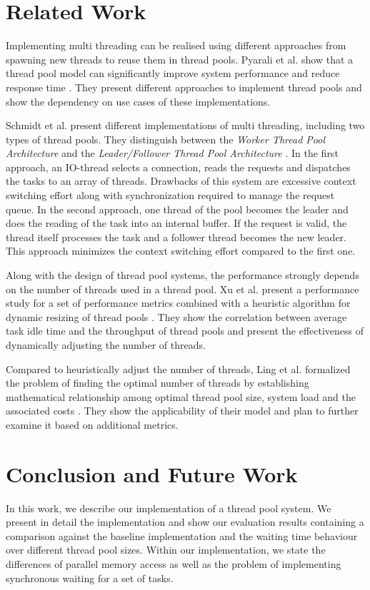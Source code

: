 \documentclass[conference]{IEEEtran}
\begin{document}
\section{Related Work}\label{sec:related}
Implementing multi threading can be realised using different approaches from spawning new threads to reuse them in thread pools. Pyarali et al. show that a thread pool model can significantly improve system performance and reduce response time \cite{pyarali2001evaluating}. They present different approaches to implement thread pools and show the dependency on use cases of these implementations.

Schmidt et al. present different implementations of multi threading, including two types of thread pools. They distinguish between the \emph{Worker Thread Pool Architecture} and the \emph{Leader/Follower Thread Pool Architecture} \cite{schmidt1998evaluating}. In the first approach, an IO-thread selects a connection, reads the requests and dispatches the tasks to an array of threads. Drawbacks of this system are excessive context switching effort along with synchronization required to manage the request queue. In the second approach, one thread of the pool becomes the leader and does the reading of the task into an internal buffer. If the request is valid, the thread itself processes the task and a follower thread becomes the new leader. This approach minimizes the context switching effort compared to the first one.

Along with the design of thread pool systems, the performance strongly depends on the number of threads used in a thread pool. Xu et al. present a performance study for a set of performance metrics combined with a heuristic algorithm for dynamic resizing of thread pools \cite{xu2004performance}. They show the correlation between average task idle time and the throughput of thread pools and present the effectiveness of dynamically adjusting the number of threads.

Compared to heuristically adjust the number of threads, Ling et al. formalized the problem of finding the optimal number of threads by establishing mathematical relationship among optimal thread pool size, system load and the associated costs \cite{ling2000analysis}. They show the applicability of their model and plan to further examine it based on additional metrics.

\section{Conclusion and Future Work}\label{sec:future}
In this work, we describe our implementation of a thread pool system. We present in detail the implementation and show our evaluation results containing a comparison against the baseline implementation and the waiting time behaviour over different thread pool sizes. Within our implementation, we state the differences of parallel memory access as well as the problem of implementing synchronous waiting for a set of tasks.
\end{document}
